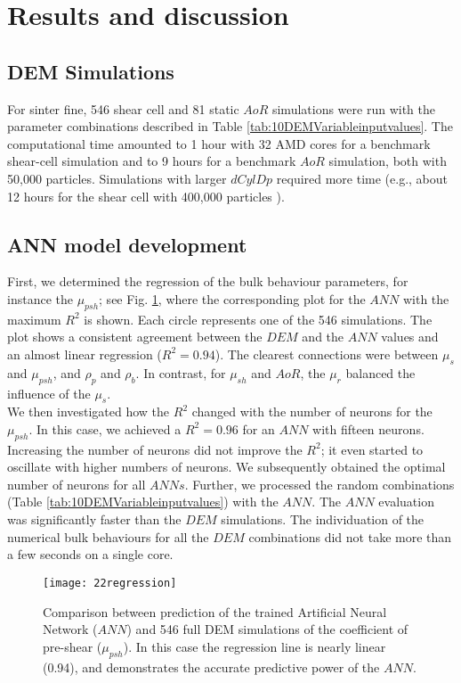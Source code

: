 \documentclass{CFD2015}
\begin{document}

\section{Results and discussion}
\label{sec:results}

\subsection{DEM Simulations}
\label{subsec:simulations}

For sinter fine, 546 shear cell and 81 static $AoR$ simulations were run with
the parameter combinations described in Table
\ref{tab:10DEMVariableinputvalues}.
The computational time amounted to 1 hour with 32 AMD cores for a benchmark
shear-cell simulation and to 9 hours for a benchmark $AoR$ simulation, both with
50,000 particles.
Simulations with larger $dCylDp$ required more time (e.g., about 12 hours for
the shear cell with 400,000 particles ). \\


\subsection{ANN model development}
\label{subsec:annmodeldev}

First, we determined the regression of the bulk behaviour parameters, for
instance the $\mu_{psh}$; see Fig. \ref{fig:22regression}, where the
corresponding plot for the $ANN$ with the maximum $R^2$ is shown. Each circle represents one of the 546
simulations.
The plot shows a consistent agreement between the 
$DEM$ and the $ANN$ values and an almost linear regression ($R^2
= 0.94$).
The clearest connections were between $\mu_s$ and $\mu_{psh}$, and
$\rho_p$ and $\rho_b$.
In contrast, for $\mu_{sh}$ and $AoR$, the $\mu_r$ balanced the influence of the 
$\mu_s$. \\
We then investigated how the $R^2$ changed with the number of neurons
for the $\mu_{psh}$.
In this case, we achieved a $R^2 = 0.96$ for an $ANN$ with fifteen neurons. 
Increasing the number of neurons did not improve the $R^2$; it even started to
oscillate with higher numbers of neurons.
We subsequently obtained the optimal number of neurons for all $ANNs$.
Further, we processed the random combinations (Table
\ref{tab:10DEMVariableinputvalues}) with the $ANN$.
The $ANN$ evaluation was significantly faster than the $DEM$ simulations. The
individuation of the numerical bulk behaviours for all the $DEM$ combinations
did not take more than a few seconds on a single core.
\begin{figure}%
\centering 
\texttt{[image: 22regression]}
\caption[Comparison between prediction of the trained ANN and full DEM
simulation]{Comparison between prediction of the trained Artificial Neural
Network ($ANN$) and 546 full DEM simulations of the coefficient of pre-shear
($\mu_{psh}$). In this case the regression line is nearly linear (0.94), and
demonstrates the accurate predictive power of the $ANN$.}
\label{fig:22regression} 
\end{figure}
\end{document}
